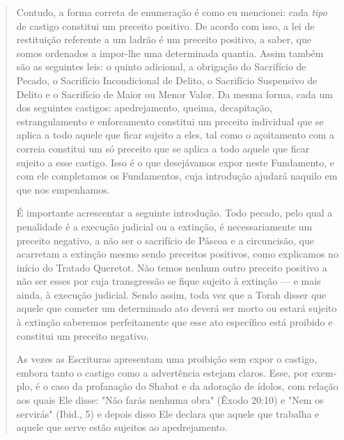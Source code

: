 \begin{quote}
Contudo, a forma correta de enumeração é como eu mencionei: ca­da
\emph{tipo} de castigo constitui um preceito positivo. De acordo com
isso, a lei de restituição referente a um ladrão é um preceito positivo,
a saber, que somos ordenados a impor-lhe uma determinada quantia. Assim
também são as seguin­tes leis: o quinto adicional, a obrigação do
Sacrifício de Pecado, o Sacrifício
Incondicional de Delito, o Sacrifício Suspensivo de Delito e o
Sacrifício de Maior ou Menor Valor. Da mesma forma, cada um dos
seguintes castigos: apedreja­mento, queima, decapitação, estrangulamento
e enforcamento constitui um pre­ceito individual que se aplica a todo
aquele que ficar sujeito a eles, tal como o açoitamento com a correia
constitui um só preceito que se aplica a todo aquele que ficar sujeito a
esse castigo. Isso é o que desejávamos expor neste Funda­mento, e com
ele completamos os Fundamentos, cuja introdução ajudará na­quilo em que
nos empenhamos.

É importante acrescentar a seguinte introdução. Todo pecado, pelo qual a
penalidade é a execução judicial ou a extinção, é necessariamente um
preceito negativo, a não ser o sacrifício de Páscoa e a circuncisão, que
acarre­tam a extinção mesmo sendo preceitos positivos, como explicamos
no início do Tratado Queretot. Não temos nenhum outro preceito positivo
a não ser es­ses por cuja transgressão se fique sujeito à extinção --- e
mais ainda, à execução judicial. Sendo assim, toda vez que a Torah
disser que aquele que cometer um determinado ato deverá ser morto ou
estará sujeito à extinção saberemos per­feitamente que esse ato
específico está proibido e constitui um preceito negativo.

As vezes as Escrituras apresentam uma proibição sem expor o casti­go,
embora tanto o castigo como a advertência estejam claros. Esse, por
exem­plo, é o caso da profanação do Shabat e da adoração de ídolos, com
relação aos quais Ele disse: "Não farás nenhuma obra" (Êxodo 20:10) e
"Nem os servi­rás" (Ibid., 5) e depois disso Ele declara que aquele que
trabalha e aquele que serve estão sujeitos ao apedrejamento.


\end{quote}
